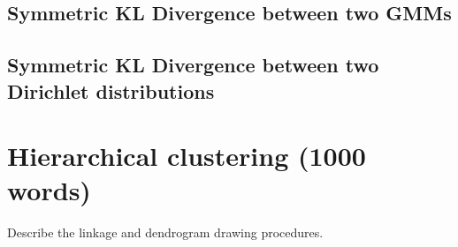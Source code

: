 \documentclass[../main.tex]{subfiles}
\begin{document}
\subsection{Symmetric KL Divergence between two GMMs}
\subsection{Symmetric KL Divergence between two Dirichlet distributions}

\section{ Hierarchical clustering (1000 words)} \label{section_hierarchical}
Describe the linkage and dendrogram drawing procedures.
\end{document}
